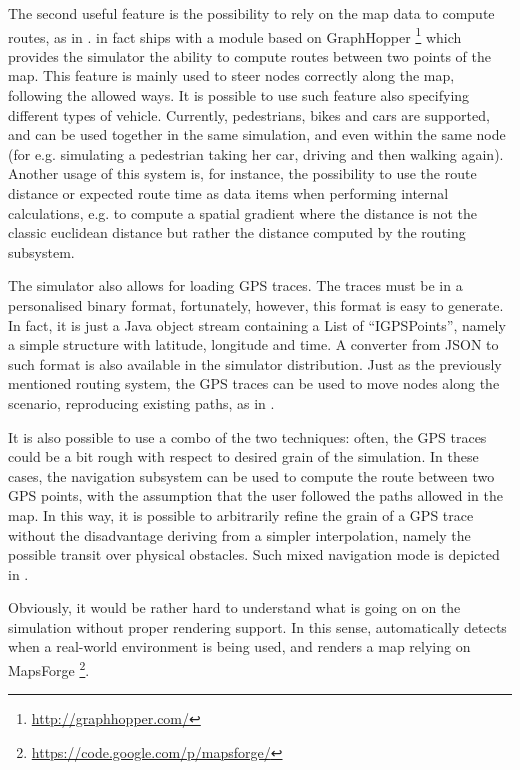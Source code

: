 \documentclass[12pt,a4paper,twoside,openright]{book}
\begin{document}
\begin{figure}
 \label{img:traces-navigation}
\end{figure}



The second useful feature is the possibility to rely on the map data to compute routes, as in .
%
\alchemist{} in fact ships with a module based on GraphHopper \footnote{\url{http://graphhopper.com/}} which provides the simulator the ability to compute routes between two points of the map.
%
This feature is mainly used to steer nodes correctly along the map, following the allowed ways.
%
It is possible to use such feature also specifying different types of vehicle.
%
Currently, pedestrians, bikes and cars are supported, and can be used together in the same simulation, and even within the same node (for e.g. simulating a pedestrian taking her car, driving and then walking again).
%
Another usage of this system is, for instance, the possibility to use the route distance or expected route time as data items when performing internal calculations, e.g. to compute a spatial gradient where the distance is not the classic euclidean distance but rather the distance computed by the routing subsystem.

The simulator also allows for loading GPS traces.
%
The traces must be in a personalised binary format, fortunately, however, this format is easy to generate.
%
In fact, it is just a Java object stream containing a List of ``IGPSPoints'', namely a simple structure with latitude, longitude and time.
%
A converter from JSON to such format is also available in the simulator distribution.
%
Just as the previously mentioned routing system, the GPS traces can be used to move nodes along the scenario, reproducing existing paths, as in .

It is also possible to use a combo of the two techniques: often, the GPS traces could be a bit rough with respect to desired grain of the simulation.
%
In these cases, the navigation subsystem can be used to compute the route between two GPS points, with the assumption that the user followed the paths allowed in the map.
%
In this way, it is possible to arbitrarily refine the grain of a GPS trace without the disadvantage deriving from a simpler interpolation, namely the possible transit over physical obstacles.
%
Such mixed navigation mode is depicted in .

Obviously, it would be rather hard to understand what is going on on the simulation without proper rendering support.
%
In this sense, \alchemist{} automatically detects when a real-world environment is being used, and renders a map relying on MapsForge \footnote{\url{https://code.google.com/p/mapsforge/}}.
\end{document}

